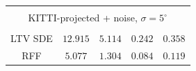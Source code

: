 \begin{table}[ht]
\begin{tabular}{c|c|c|c|c}
    \multicolumn{5}{l}{}\\[-0.5em]
    \multicolumn{5}{c}{KITTI-projected + noise, $\sigma=5^\circ$} \\
    \multicolumn{5}{l}{}\\[-0.7em]
    \toprule
    LTV SDE & $12.915$ & $5.114$ & $0.242$ & $0.358$\\
    RFF & $5.077$ & $1.304$ & $0.084$ & $0.119$ \\
    \bottomrule
    \end{tabular}
\end{table}

